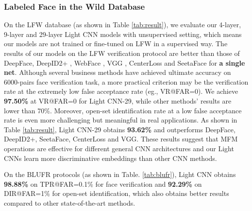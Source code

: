 \documentclass[journal,transmag]{IEEEtran}
\begin{document}
\subsubsection{Labeled Face in the Wild Database}
On the LFW database (as shown in Table \ref{tab:result}), we evaluate our 4-layer, 9-layer and 29-layer Light CNN models with unsupervised setting, which means our models are not trained or fine-tuned on LFW in a supervised way. The results of our models on the LFW verification protocol are better than those of DeepFace\cite{taigman2014deepface}, DeepID2+ \cite{DBLP:conf/cvpr/SunWT15}, WebFace \cite{yi2014learning}, VGG \cite{parkhi2015deep}, CenterLoss \cite{wen2016discriminative} and SeetaFace \cite{liu2016viplfacenet} for \textbf{a single net}.
Although several business methods have achieved ultimate accuracy on 6000-pairs face verification task, a more practical criterion may be the verification rate at the extremely low false acceptance rate (eg., VR@FAR=0). We achieve \textbf{97.50\%} at VR@FAR=0 for Light CNN-29, while other methods' results are lower than 70\%. Moreover, open-set identification rate at a low false acceptance rate is even more challenging but meaningful in real applications. As shown in Table \ref{tab:result}, Light CNN-29 obtains \textbf{93.62\%} and outperforms DeepFace, DeepID2+, SeetaFace, CenterLoss and VGG. These results suggest that MFM operations are effective for different general CNN architectures and our Light CNNs learn more discriminative embeddings than other CNN methods.

On the BLUFR protocols (as shown in Table. \ref{tab:blufr}), Light CNN obtains \textbf{98.88\%} on TPR@FAR=0.1\% for face verification and  \textbf{92.29\%} on DIR@FAR=1\% for open-set identification, which also obtains better results compared to other state-of-the-art methods.
\end{document}
